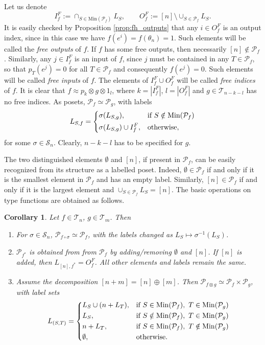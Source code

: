 \documentclass[12pt]{article}
\newtheorem{coro}{Corollary}
\theoremstyle{definition}
\theoremstyle{remark}
\def\Te{\mathcal T}
\def\Pe{\mathcal P}
\def\permut{\mathscr{S}}
\begin{document}
Let us denote
\[
I_f^F:=\cap_{S\in \mathrm{Min}(\Pe_f)} L_S, \qquad O_f^F:=[n]\setminus
\cup_{S\in \Pe_f}L_S.
\]
It is easily checked by Proposition \ref{prop:fh_outputs} that any  $i\in O_f^F$ is an
output index, since in this case  we have
$f(e^i)=f(\theta_n)=1$. Such elements will be called
the {\em free outputs} of $f$. If $f$ has some free outputs, then necessarily $[n]\notin
\Pe_f$. Similarly, any  $j\in I_f^F$ is an input of $f$, since $j$ must be
contained in any $T\in \Pe_f$, so that $p_T(e^j)=0$ for all $T\in \Pe_f$ and consequently
$f(e^j)=0$. Such elements will be called {\em free
inputs} of $f$. The elements of $I_f^F\cup O_f^F$ will be called {\em free indices} of
$f$.  It is clear that $f\approx p_k\otimes g\otimes
1_l$, where
$k=|I_f^F|$, $l=|O_f^F|$  and $g\in \Te_{n-k-l}$ has no free indices. As posets,
$\Pe_f\simeq \Pe_g$,  with labels
\[
L_{S,f}=\begin{dcases} \sigma(L_{S,g}), &\text{if } S\notin \mathrm{Min}(\Pe_f)\\
\sigma(L_{S,g})\cup I^F_f, &\text {otherwise},
\end{dcases}
\]
for some $\sigma\in \permut_n$. Clearly, $n-k-l$ has to be specified for $g$. 



The  two distinguished elements $\emptyset$ and $[n]$, if present in $\Pe_f$, can be easily recognized
from its structure as a labelled poset. Indeed, $\emptyset\in \Pe_f$ if and only if it is
the smallest element in $\Pe_f$ and has an empty label. 
Similarly, $[n]\in \Pe_f$ if and
only if it is the largest element and $\cup_{S\in \Pe_f}L_S=[n]$. The basic operations on
type functions are obtained as follows. 

\begin{coro}\label{coro:Pf} Let $f\in \Te_n$, $g\in \Te_m$. Then
\begin{enumerate}
\item[(i)] For $\sigma\in \permut_n$,  $\Pe_{f\circ\sigma}\simeq \Pe_f$, with the labels
changed as $L_S\mapsto \sigma^{-1}(L_S)$.

\item[(ii)] $\Pe_{f^*}$ is obtained from from $\Pe_f$ by adding/removing $\emptyset$ and
$[n]$. If $[n]$ is added, then  $L_{[n],f^*}=O_f^F$.  All other elements and labels remain the same. 
\item[(iii)] Assume the decomposition $[n+m]=[n]\oplus[m]$. Then 
$\Pe_{f\otimes g}\simeq \Pe_f\times \Pe_g$, with label sets
\[
L_{(S,T)}=\begin{dcases} L_S\cup (n+L_T), & \text{if } S\in \mathrm{Min}(\Pe_f),\ T\in
\mathrm{Min}(\Pe_g)\\
L_S, & \text{if } S\notin \mathrm{Min}(\Pe_f),\ T\in
\mathrm{Min}(\Pe_g)\\
n+ L_T, &\text{if }S \in \mathrm{Min}(\Pe_f),\ T\notin
\mathrm{Min}(\Pe_g)\\
\emptyset, & \text{otherwise}.
\end{dcases}
\]



\end{enumerate}


\end{coro}
\end{document}
